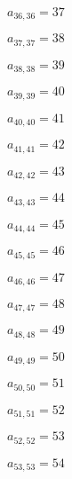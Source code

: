 \documentclass[a4paper,12pt]{article}
\begin{document}
$a _{ 36, 36 } = 37$

$a _{ 37, 37 } = 38$

$a _{ 38, 38 } = 39$

$a _{ 39, 39 } = 40$

$a _{ 40, 40 } = 41$

$a _{ 41, 41 } = 42$

$a _{ 42, 42 } = 43$

$a _{ 43, 43 } = 44$

$a _{ 44, 44 } = 45$

$a _{ 45, 45 } = 46$

$a _{ 46, 46 } = 47$

$a _{ 47, 47 } = 48$

$a _{ 48, 48 } = 49$

$a _{ 49, 49 } = 50$

$a _{ 50, 50 } = 51$

$a _{ 51, 51 } = 52$

$a _{ 52, 52 } = 53$

$a _{ 53, 53 } = 54$
\end{document}
